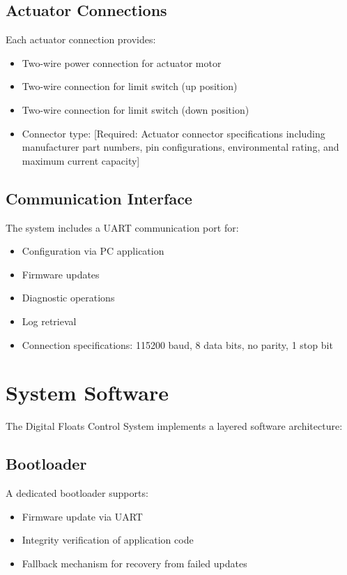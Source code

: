 \documentclass[12pt,a4paper,twoside,openright]{book}
\begin{document}
\subsection{Actuator Connections}
Each actuator connection provides:
\begin{itemize}
    \item Two-wire power connection for actuator motor
    \item Two-wire connection for limit switch (up position)
    \item Two-wire connection for limit switch (down position)
    \item Connector type: {\color{missingred}[Required: Actuator connector specifications including manufacturer part numbers, pin configurations, environmental rating, and maximum current capacity]}
\end{itemize}

\subsection{Communication Interface}
The system includes a UART communication port for:
\begin{itemize}
    \item Configuration via PC application
    \item Firmware updates
    \item Diagnostic operations
    \item Log retrieval
    \item Connection specifications: 115200 baud, 8 data bits, no parity, 1 stop bit
\end{itemize}

\section{System Software}

The Digital Floats Control System implements a layered software architecture:

\subsection{Bootloader}
A dedicated bootloader supports:
\begin{itemize}
    \item Firmware update via UART
    \item Integrity verification of application code
    \item Fallback mechanism for recovery from failed updates
\end{itemize}
\end{document}
